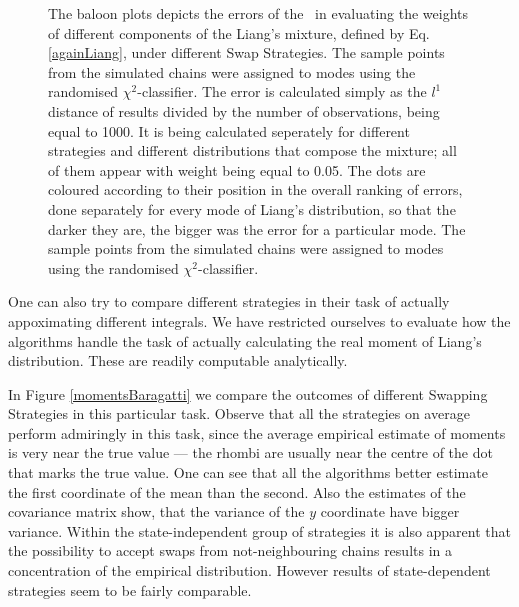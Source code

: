 \documentclass{book}
\begin{document}
\begin{figure}[ht]
{		The baloon plots depicts the errors of the \PT\, in evaluating the weights of different components of the Liang's mixture, defined by Eq. \ref{againLiang}, under different Swap Strategies. The sample points from the simulated chains were assigned to modes using the randomised $\chi^2$-classifier. The error is calculated simply as the $l^1$ distance of results divided by the number of observations, being equal to 1000. It is being calculated seperately for different strategies and different distributions that compose the mixture; all of them appear with weight being equal to 0.05. The dots are coloured according to their position in the overall ranking of errors, done separately for every mode of Liang's distribution, so that the darker they are, the bigger was the error for a particular mode. The sample points from the simulated chains were assigned to modes using the randomised $\chi^2$-classifier.   
	}\label{AAE}
\end{figure}

One can also try to compare different strategies in their task of actually appoximating different integrals. We have restricted ourselves to evaluate how the algorithms handle the task of actually calculating the real moment of Liang's distribution. These are readily computable analytically. 

In Figure \ref{momentsBaragatti} we compare the outcomes of different Swapping Strategies in this particular task. Observe that all the strategies on average perform admiringly in this task, since the average empirical estimate of moments is very near the true value --- the rhombi are usually near the centre of the dot that marks the true value. One can see that all the algorithms better estimate the first coordinate of the mean than the second. Also the estimates of the covariance matrix show, that the variance of the $y$ coordinate have bigger variance. Within the state-independent group of strategies it is also apparent that the possibility to accept swaps from not-neighbouring chains results in a concentration of the empirical distribution. However results of state-dependent strategies seem to be fairly comparable. 
\end{document}
